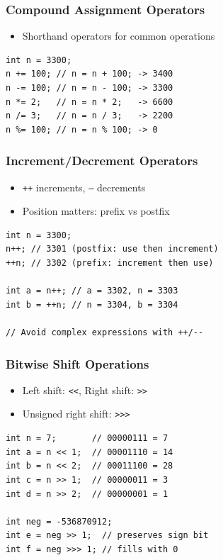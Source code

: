 \documentclass[serif, aspectratio=169]{beamer}
\begin{document}
\begin{frame}[fragile]
\frametitle{Compound Assignment Operators}
\begin{itemize}
    \item Shorthand operators for common operations
\end{itemize}
\begin{lstlisting}
int n = 3300;
n += 100; // n = n + 100; -> 3400
n -= 100; // n = n - 100; -> 3300
n *= 2;   // n = n * 2;   -> 6600
n /= 3;   // n = n / 3;   -> 2200
n %= 100; // n = n % 100; -> 0
\end{lstlisting}
\end{frame}

\begin{frame}[fragile]
\frametitle{Increment/Decrement Operators}
\begin{itemize}
    \item \texttt{++} increments, \texttt{--} decrements
    \item Position matters: prefix vs postfix
\end{itemize}
\begin{lstlisting}
int n = 3300;
n++; // 3301 (postfix: use then increment)
++n; // 3302 (prefix: increment then use)

int a = n++; // a = 3302, n = 3303
int b = ++n; // n = 3304, b = 3304

// Avoid complex expressions with ++/--
\end{lstlisting}
\end{frame}

\begin{frame}[fragile]
\frametitle{Bitwise Shift Operations}
\begin{itemize}
    \item Left shift: \texttt{\textless{}\textless{}}, Right shift: \texttt{\textgreater{}\textgreater{}}
    \item Unsigned right shift: \texttt{\textgreater{}\textgreater{}\textgreater{}}
\end{itemize}
\begin{lstlisting}
int n = 7;       // 00000111 = 7
int a = n << 1;  // 00001110 = 14
int b = n << 2;  // 00011100 = 28
int c = n >> 1;  // 00000011 = 3
int d = n >> 2;  // 00000001 = 1

int neg = -536870912;
int e = neg >> 1;  // preserves sign bit
int f = neg >>> 1; // fills with 0
\end{lstlisting}
\end{frame}
\end{document}
